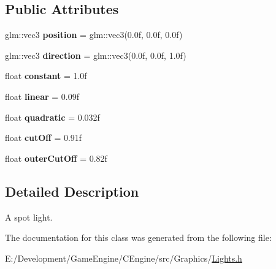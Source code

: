 \subsection*{Public Attributes}
\begin{DoxyCompactItemize}
\item 
\mbox{\label{classce_1_1graphics_1_1_spot_light_a84a6b12c9c9a761d54672d68bcf5e2b0}} 
glm\+::vec3 {\bfseries position} = glm\+::vec3(0.\+0f, 0.\+0f, 0.\+0f)
\item 
\mbox{\label{classce_1_1graphics_1_1_spot_light_a18634cf5c779fd34efb3298774f02d24}} 
glm\+::vec3 {\bfseries direction} = glm\+::vec3(0.\+0f, 0.\+0f, 1.\+0f)
\item 
\mbox{\label{classce_1_1graphics_1_1_spot_light_a6cb09e93a8cc20ba0f6ed21fcfc0f720}} 
float {\bfseries constant} = 1.\+0f
\item 
\mbox{\label{classce_1_1graphics_1_1_spot_light_af9bd65024e9ee84e0a2aae9dda6a8807}} 
float {\bfseries linear} = 0.\+09f
\item 
\mbox{\label{classce_1_1graphics_1_1_spot_light_a6afbb4be9fda216b86dfba608aa4c2dd}} 
float {\bfseries quadratic} = 0.\+032f
\item 
\mbox{\label{classce_1_1graphics_1_1_spot_light_af4b4eac01e5396be4a95fdf09e86363c}} 
float {\bfseries cut\+Off} = 0.\+91f
\item 
\mbox{\label{classce_1_1graphics_1_1_spot_light_a0cb85ec1332296f31b744b5aaa326c1b}} 
float {\bfseries outer\+Cut\+Off} = 0.\+82f
\end{DoxyCompactItemize}


\subsection{Detailed Description}
A spot light. 

The documentation for this class was generated from the following file\+:\begin{DoxyCompactItemize}
\item 
E\+:/\+Development/\+Game\+Engine/\+C\+Engine/src/\+Graphics/\hyperlink{_lights_8h}{Lights.\+h}\end{DoxyCompactItemize}

